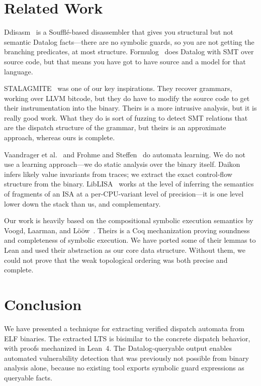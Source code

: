 \documentclass[conference]{./template/IEEEtran}
\begin{document}
\section{Related Work}

Ddisasm~\cite{flores2020ddisasm} is a Souffl\'{e}-based disassembler that gives you structural but not semantic Datalog facts---there are no symbolic guards, so you are not getting the branching predicates, at most structure. Formulog~\cite{bembenek2020formulog} does Datalog with SMT over source code, but that means you have got to have source and a model for that language.

STALAGMITE~\cite{bettscheider2024lookma} was one of our key inspirations. They recover grammars, working over LLVM bitcode, but they do have to modify the source code to get their instrumentation into the binary. Theirs is a more intrusive analysis, but it is really good work. What they do is sort of fuzzing to detect SMT relations that are the dispatch structure of the grammar, but theirs is an approximate approach, whereas ours is complete.

Vaandrager et al.~\cite{vaandrager2021myhill} and Frohme and Steffen~\cite{frohme2021compositional} do automata learning. We do not use a learning approach---we do static analysis over the binary itself. Daikon~\cite{ernst2001daikon} infers likely value invariants from traces; we extract the exact control-flow structure from the binary. LibLISA~\cite{liblisa2024} works at the level of inferring the semantics of fragments of an ISA at a per-CPU-variant level of precision---it is one level lower down the stack than us, and complementary.

Our work is heavily based on the compositional symbolic execution semantics by Voogd, Laarman, and L\"{o}\"{o}w~\cite{voogd2025compositional}. Theirs is a Coq mechanization proving soundness and completeness of symbolic execution. We have ported some of their lemmas to Lean and used their abstraction as our core data structure. Without them, we could not prove that the weak topological ordering was both precise and complete.

\section{Conclusion}

We have presented a technique for extracting verified dispatch automata from ELF binaries. The extracted LTS is bisimilar to the concrete dispatch behavior, with proofs mechanized in Lean~4. The Datalog-queryable output enables automated vulnerability detection that was previously not possible from binary analysis alone, because no existing tool exports symbolic guard expressions as queryable facts.



\end{document}
